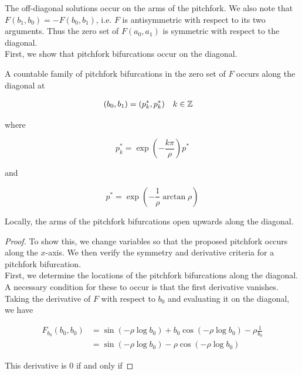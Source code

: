\documentclass[thesis.tex]{subfiles}
\begin{document}
The off-diagonal solutions occur on the arms of the pitchfork. We also note that 
$F(b_1, b_0) = -F(b_0, b_1)$, i.e. $F$ is antisymmetric with respect to its two arguments. Thus the zero set of $F(a_0, a_1)$ is symmetric with respect to the diagonal.\\

First, we show that pitchfork bifurcations occur on the diagonal.


\begin{lemma}\label{pitchforkF}
A countable family of pitchfork bifurcations in the zero set of $F$ occurs along the diagonal at 

\begin{align*}
(b_0, b_1) &= (p_k^*, p_k^*) && k \in {\mathbb Z}
\end{align*}

where 

\begin{equation}
p^*_k = \exp\left(-\frac{k \pi}{\rho} \right) p^*
\end{equation}

and 

\begin{equation}
p^* = \exp \left( -\frac{1}{\rho} \arctan \rho \right)
\end{equation}

Locally, the arms of the pitchfork bifurcations open upwards along the diagonal.

\begin{proof}
To show this, we change variables so that the proposed pitchfork occurs along the $x$-axis. We then verify the symmetry and derivative criteria for a pitchfork bifurcation.\\

First, we determine the locations of the pitchfork bifurcations along the diagonal. A necessary condition for these to occur is that the first derivative vanishes. Taking the derivative of $F$ with respect to $b_0$ and evaluating it on the diagonal, we have

\begin{align*}
F_{b_0}(b_0, b_0) &= 
\sin \left( -\rho \log b_0 \right)
+ b_0 \cos \left( - \rho \log b_0 \right)- \rho \frac{1}{b_0} \\
&= \sin \left( - \rho \log b_0 \right) - \rho \cos \left( - \rho \log b_0 \right)
\end{align*}

This derivative is 0 if and only if


\end{proof}
\end{lemma}
\end{document}
